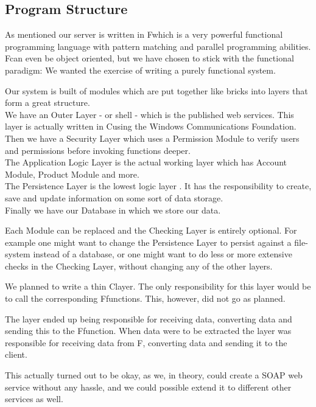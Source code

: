 \subsection{Program Structure}
As mentioned  our server is written in F\Sh which is a very powerful functional programming language with pattern matching and parallel programming abilities.
F\Sh can even be object oriented, but we have chosen to stick with the functional paradigm: We wanted the exercise of writing a purely functional system.

Our system is built of modules which are put together like bricks into layers that form a great structure. 
\\We have an Outer Layer - or shell - which is the published web services. This layer is actually written in C\Sh using the Windows Communications Foundation.
\\Then we have a Security Layer which uses a Permission Module to verify users and permissions before invoking functions deeper.
\\The Application Logic Layer is the actual working layer which has Account Module, Product Module and more.
\\The Persistence Layer is the lowest logic layer . It has the responsibility to create, save and update information on some sort of data storage.
\\Finally we have our Database in which we store our data.

Each Module can be replaced and the Checking Layer is entirely optional. For example one might want to change the Persistence Layer to persist against a file-system instead of a database, or one might want to do less or more extensive checks in the Checking Layer, without changing any of the other layers.

We planned to write a thin C\Sh layer. The only responsibility for this layer would be to call the corresponding F\Sh functions. This, however, did not go as planned.

The layer ended up being responsible for receiving data, converting data and sending this to the F\Sh function. When data were to be extracted the layer was responsible for receiving data from F\Sh, converting data and sending it to the client.

This actually turned out to be okay, as we, in theory, could create a SOAP web service without any hassle, and we could possible extend it to different other services as well.

